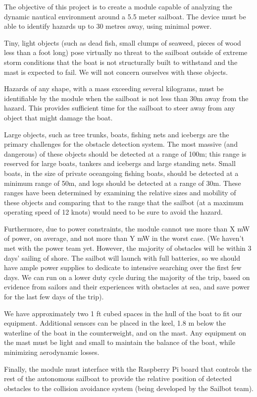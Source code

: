 The objective of this project is to create a module capable of analyzing the dynamic nautical environment around a 5.5 meter sailboat. The device must be able to identify hazards up to 30 metres away, using minimal power.

Tiny, light objects (such as dead fish, small clumps of seaweed, pieces of wood less than a foot long) pose virtually no threat to the sailboat outside of extreme storm conditions that the boat is not structurally built to withstand and the mast is expected to fail. We will not concern ourselves with these objects.

Hazards of any shape, with a mass exceeding several kilograms, must be identifiable by the module when the sailboat is not less than 30m away from the hazard. This provides sufficient time for the sailboat to steer away from any object that might damage the boat.

Large objects, such as tree trunks, boats, fishing nets and icebergs are the primary challenges for the obstacle detection system. The most massive (and dangerous) of these objects should be detected at a range of 100m; this range is reserved for large boats, tankers and icebergs and large standing nets. Small boats, in the size of private oceangoing fishing boats, should be detected at a minimum range of 50m, and logs should be detected at a range of 30m. These ranges have been determined by examining the relative sizes and mobility of these objects and comparing that to the range that the sailbot (at a maximum operating speed of 12 knots) would need to be sure to avoid the hazard.

Furthermore, due to power constraints, the module cannot use more than X mW of power, on average, and not more than Y mW in the worst case. (We haven't met with the power team yet. However, the majority of obstacles will be within 3 days' sailing of shore. The sailbot will launch with full batteries, so we should have ample power supplies to dedicate to intensive searching over the first few days. We can run on a lower duty cycle during the majority of the trip, based on evidence from sailors and their experiences with obstacles at sea, and save power for the last few days of the trip).

We have approximately two 1 ft cubed spaces in the hull of the boat to fit our equipment. Additional sensors can be placed in the keel, 1.8 m below the waterline of the boat in the counterweight, and on the mast. Any equipment on the mast must be light and small to maintain the balance of the boat, while minimizing aerodynamic losses.

Finally, the module must interface with the Raspberry Pi board that controls the rest of the autonomous sailboat to provide the relative position of detected obstacles to the collision avoidance system (being developed by the Sailbot team).